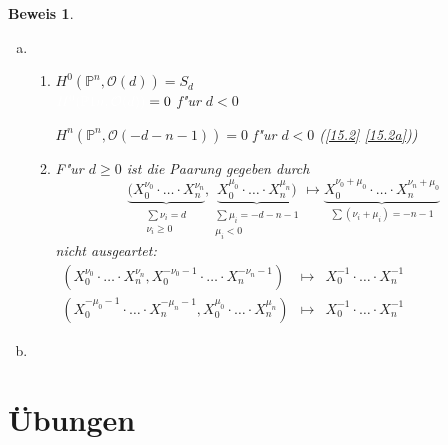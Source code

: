 \documentclass[paper = A4, fontsize=12pt, numbers=noendperiod, chapterprefix=true]{scrbook}
\renewcommand*{\othersectionlevelsformat}[3]{\ifstr{#1}{section}{\S\ #3\autodot}{#3\autodot}\enskip}
\theoremstyle{break}
\theoremstyle{nonumberbreak}
\newtheorem{bew}{Beweis}
\theoremstyle{nonumberplain}
\newcommand{\IP}{\mathbb{P}}%
\newcommand{\calO}{\mathcal{O}}
\begin{document}
\begin{bew}\begin{enumerate}[a)]
\item[b)]
	\begin{enumerate}[\underline{$d < 0$:}]
	\item[\underline{$d < 0$:}]
		$H^0(\IP^n, \calO(d)) = S_d$\\
		$\textcolor{white}{H^0(\IP1n, \calO(d))} = 0$ f"ur $d < 0$
		
		$H^n(\IP^n, \calO(-d-n-1)) = 0$ f"ur $d < 0$ (\ref{15.2} \ref{15.2a}))
	\item[\underline{$d \ge 0$:}]
		F"ur $d \ge 0$ ist die Paarung gegeben durch
			\[ \underbrace{(X_0^{\nu_0} \cdot \ldots \cdot X_n^{\nu_n}}_{\substack{\sum \nu_i = d \\ \nu_i \ge 0}}, \underbrace{X_0^{\mu_0} \cdot \ldots \cdot X_n^{\mu_n})}_{\substack{\sum \mu_i = -d-n-1 \\ \mu_i < 0}} \mapsto  \underbrace{X_0^{\nu_0 + \mu_0} \cdot \ldots \cdot X_n^{\nu_n + \mu_0}}_{\sum (\nu_i + \mu_i) = -n-1}\]
		nicht ausgeartet: $\begin{array}{lcl} (X_0^{\nu_0} \cdot \ldots \cdot X_n^{\nu_n}, X_0^{-\nu_0-1} \cdot \ldots \cdot X_n^{-\nu_n-1}) &\mapsto& X_0^{-1} \cdot \ldots \cdot X_n^{-1} \\ (X_0^{-\mu_0-1} \cdot \ldots \cdot X_n^{-\mu_n-1}, X_0^{\mu_0} \cdot \ldots \cdot X_n^{\mu_n}) &\mapsto& X_0^{-1} \cdot \ldots \cdot X_n^{-1}\end{array}$
	\end{enumerate}
\item[c)]
	
\end{enumerate}\end{bew}




\appendix


\chapter{\"Ubungen}

\renewcommand*{\othersectionlevelsformat}[3]{\ifstr{#1}{section}{\"Ubung\ #3\ vom\ }{#3\autodot\enskip}}
\end{document}
